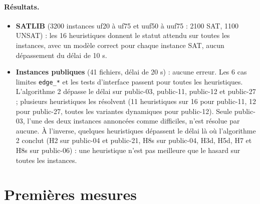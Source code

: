 \documentclass[11pt,a4paper]{article}
\begin{document}
\paragraph{Résultats.}
\begin{itemize}
  \item \textbf{SATLIB} (3200 instances uf20 à uf75 et uuf50 à uuf75 :
    2100 SAT, 1100 UNSAT) : les 16 heuristiques donnent le statut attendu
    sur toutes les instances, avec un modèle correct pour chaque instance
    SAT, aucun dépassement du délai de 10 s.
  \item \textbf{Instances publiques} (41 fichiers, délai de 20 s) : aucune
    erreur. Les 6 cas limites \texttt{edge\_*} et les tests d'interface
    passent pour toutes les heuristiques. L'algorithme 2 dépasse le délai
    sur public-03, public-11, public-12 et public-27 ; plusieurs heuristiques
    les résolvent (11 heuristiques sur 16 pour public-11, 12 pour
    public-27, toutes les variantes dynamiques pour public-12). Seule
    public-03, l'une des deux instances annoncées comme difficiles, n'est
    résolue par aucune. À l'inverse, quelques heuristiques dépassent le
    délai là où l'algorithme 2 conclut (H2 sur public-04 et public-21,
    H8s sur public-04, H3d, H5d, H7 et H8s sur public-06) : une heuristique n'est pas
    meilleure que le hasard sur toutes les instances.
\end{itemize}

\section{Premières mesures}
\label{sec:mesures}
\end{document}
